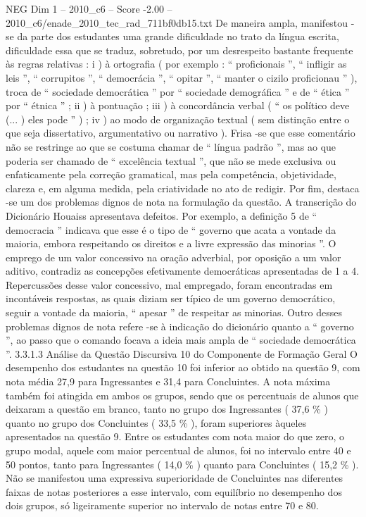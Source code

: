 \begin{textsample}{NEG Dim 1 – 2010\_c6 – Score -2.00 – 2010\_c6/enade\_2010\_tec\_rad\_711bf0db15.txt}
De maneira ampla, manifestou -se da parte dos estudantes uma grande dificuldade no trato da língua escrita, dificuldade essa que se traduz, sobretudo, por um desrespeito bastante frequente às regras relativas : i ) à ortografia ( por exemplo : “ proficionais ”, “ infligir as leis ”, “ corrupitos ”, “ democrácia ”, “ opitar ”, “ manter o cizilo proficionau ” ), troca de “ sociedade democrática ” por “ sociedade demográfica ” e de “ ética ” por “ étnica ” ; ii ) à pontuação ; iii ) à concordância verbal ( “ os político deve (... ) eles pode ” ) ; iv ) ao modo de organização textual ( sem distinção entre o que seja dissertativo, argumentativo ou narrativo ).
Frisa -se que esse comentário não se restringe ao que se costuma chamar de “ língua padrão ”, mas ao que poderia ser chamado de “ excelência textual ”, que não se mede exclusiva ou enfaticamente pela correção gramatical, mas pela competência, objetividade, clareza e, em alguma medida, pela criatividade no ato de redigir.
Por fim, destaca -se um dos problemas dignos de nota na formulação da questão.
A transcrição do Dicionário Houaiss apresentava defeitos.
Por exemplo, a definição 5 de “ democracia ” indicava que esse é o tipo de “ governo que acata a vontade da maioria, embora respeitando os direitos e a livre expressão das minorias ”.
O emprego de um valor concessivo na oração adverbial, por oposição a um valor aditivo, contradiz as concepções efetivamente democráticas apresentadas de 1 a 4.
Repercussões desse valor concessivo, mal empregado, foram encontradas em incontáveis respostas, as quais diziam ser típico de um governo democrático, seguir a vontade da maioria, “ apesar ” de respeitar as minorias.
Outro desses problemas dignos de nota refere -se à indicação do dicionário quanto a “ governo ”, ao passo que o comando focava a ideia mais ampla de “ sociedade democrática ”. 3.3.1.3 Análise da Questão Discursiva 10 do Componente de Formação Geral O desempenho dos estudantes na questão 10 foi inferior ao obtido na questão 9, com nota média 27,9 para Ingressantes e 31,4 para Concluintes.
A nota máxima também foi atingida em ambos os grupos, sendo que os percentuais de alunos que deixaram a questão em branco, tanto no grupo dos Ingressantes ( 37,6 \% ) quanto no grupo dos Concluintes ( 33,5 \% ), foram superiores àqueles apresentados na questão 9.
Entre os estudantes com nota maior do que zero, o grupo modal, aquele com maior percentual de alunos, foi no intervalo entre 40 e 50 pontos, tanto para Ingressantes ( 14,0 \% ) quanto para Concluintes ( 15,2 \% ).
Não se manifestou uma expressiva superioridade de Concluintes nas diferentes faixas de notas posteriores a esse intervalo, com equilíbrio no desempenho dos dois grupos, só ligeiramente superior no intervalo de notas entre 70 e 80.

\end{textsample}
